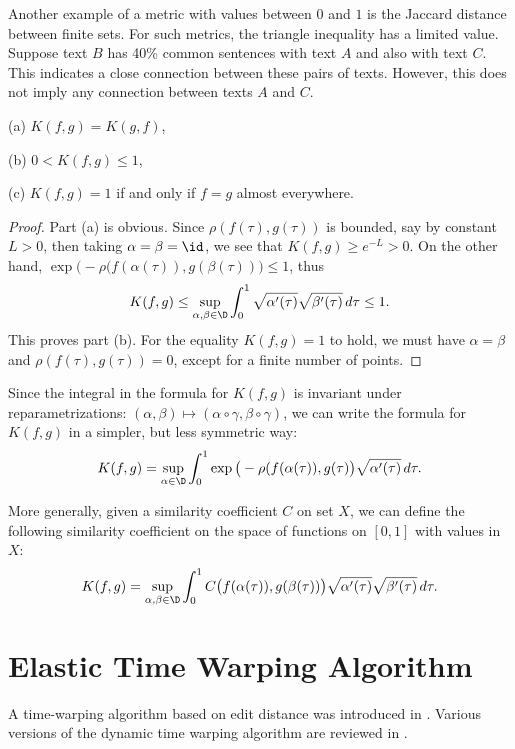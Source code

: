 \documentclass[12pt]{amsart}
\begin{document}
Another example of a metric with values between $0$ and $1$ is the Jaccard distance between finite sets. For such metrics, the triangle inequality has a limited value. Suppose text $B$ has 40\% common sentences with text $A$ and also with text $C$. This indicates a close connection between these pairs of texts. However, this does not imply any connection between texts $A$ and $C$.

\begin{lemma}
(a) $K(f, g) = K(g, f)$,

(b) $0 < K(f, g) \leq 1$,

(c) $K(f, g) = 1$ if and only if $f = g$ almost everywhere.
\end{lemma}
\begin{proof}
Part (a) is obvious.  Since $\rho(f(\tau), g(\tau))$ is bounded, say by constant $L > 0$, then taking $\alpha = \beta = \id$, we see that $K(f,g) \geq e^{-L} > 0$. On the other hand, $ \exp\big(-\rho(f(\alpha(\tau)), g(\beta(\tau))\big) \leq 1$, thus 
\[K(f,g) \leq \sup_{\alpha, \beta \in \D} \int_0^1 \sqrt{\alpha^\prime(\tau)} \sqrt{\beta^\prime(\tau)} \,d\tau \leq 1.\]
This proves part (b). For the equality $K(f,g) = 1$ to hold, we must have $\alpha = \beta$ and 
$\rho(f(\tau), g(\tau)) = 0$, except for a finite number of points. 
\end{proof}

Since the integral in the formula for $K(f,g)$ is invariant under reparametrizations: $(\alpha, \beta) \mapsto 
(\alpha \circ \gamma, \beta \circ \gamma)$, we can write the formula for $K(f,g)$ in a simpler, but less symmetric way:
\[K (f, g) = \sup_{\alpha \in \D} \int_0^1 \exp\big(-\rho(f(\alpha(\tau)), g(\tau)\big) \sqrt{\alpha^\prime(\tau)} \,d\tau.\]

More generally, given a similarity coefficient $C$ on set $X$, we can define the following similarity coefficient on the space of functions on $[0,1]$ with values in $X$:
\[K(f,g) = \sup_{\alpha, \beta \in \D} \int_0^1 C\big(f(\alpha(\tau)), g(\beta(\tau))\big) \sqrt{\alpha^\prime(\tau)} \sqrt{\beta^\prime(\tau)} \,d\tau.\]

\section{Elastic Time Warping Algorithm}
\label{algorithm}

A time-warping algorithm based on edit distance was introduced in \cite{M}. Various versions of the dynamic time warping algorithm are reviewed in \cite{DB}.
\end{document}
